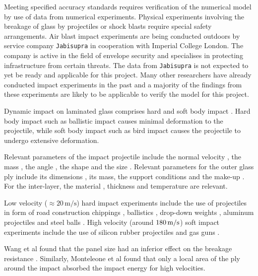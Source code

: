 \documentclass[format=acmtog,12pt,screen=true,review=false,natbib=false,]{acmart}
\begin{document}
Meeting specified accuracy standards \cite{Sto15} requires verification of the numerical model by use of data from numerical experiments. Physical experiments involving the breakage of glass by projectiles or shock blasts require special safety arrangements. Air blast impact experiments are being conducted outdoors by service company \texttt{Jabisupra} \cite{Jab16} in cooperation with Imperial College London. The company is active in the field of envelope security and specialises in protecting infrastructure from certain threats. The data from \texttt{Jabisupra} is not expected to yet be ready and applicable for this project. Many other researchers have already conducted impact experiments in the past and a majority of the findings from these experiments are likely to be applicable to verify the model for this project.

\bigbreak
Dynamic impact on laminated glass comprises hard and soft body impact \cite{Moh17}. Hard body impact such as ballistic impact \cite{Bra10} causes minimal deformation to the projectile, while soft body impact such as bird impact \cite{Moh17} causes the projectile to undergo extensive deformation.

\bigbreak
Relevant parameters of the impact projectile include the normal velocity \cite{Gra98, Kar14, Dar13, Wu14}, the mass \cite{Kar14, Dar13}, the angle \cite{Gra98, Kar14, Dar13}, the shape \cite{Dar13} and the size \cite{Wu14}. Relevant parameters for the outer glass ply include its dimensions \cite{Wan18}, its mass, the support conditions \cite{Wan18} and the make-up \cite{Wan18}. For the inter-layer, the material \cite{Moh18, Wan18, Mon04}, thickness \cite{Ji98, Kar14, Wan18} and temperature \cite{Moh18, Zha19} are relevant.

\bigbreak
Low velocity ($\approx 20\,\mathrm{m}/\mathrm{s}$) hard impact experiments include the use of projectiles in form of road construction chippings \cite{Gra98}, ballistics \cite{Mon04}, drop-down weights \cite{Che15, Mil12, Wan18}, aluminum projectiles \cite{Mil12} and steel balls \cite{Beh99, Flo98, Wan18}. High velocity (around $180\, {\rm{m}}/{\rm{s}}$) soft impact experiments include the use of silicon rubber projectiles \cite{Moh17} and gas guns \cite{Moh18}.

\bigbreak
Wang et al \cite{Wan18} found that the panel size had an inferior effect on the breakage resistance \cite{Wan18}. Similarly, Monteleone et al \cite{Mon04} found that only a local area of the ply around the impact absorbed the impact energy for high velocities.
\end{document}
